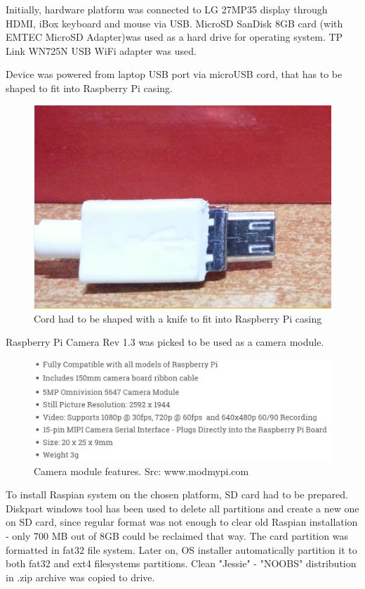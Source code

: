 \documentclass[12pt,twoside,a4paper]{article}
\begin{document}
Initially, hardware platform was connected to LG 27MP35 display through HDMI, iBox keyboard and mouse via USB. 
MicroSD SanDisk 8GB card (with EMTEC MicroSD Adapter)was used as a hard drive for operating system. 
TP Link WN725N USB WiFi adapter was used.

Device was powered from laptop USB port via microUSB cord, that has to be shaped to fit into Raspberry Pi casing.



\begin{figure}[H]
\centering
\includegraphics[width=0.3\paperwidth]{cable}
\caption{Cord had to be shaped with a knife to fit into Raspberry Pi casing}
\end{figure}

Raspberry Pi Camera Rev 1.3 was picked to be used as a camera module. 

\begin{figure}[H]
\centering
\includegraphics[width=0.5\paperwidth]{features}
\caption{Camera module features. Src: www.modmypi.com}
\end{figure}

To install Raspian system on the chosen platform, SD card had to be prepared.
Diskpart windows tool has been used to delete all partitions and create a new one on SD card, since regular format was not enough to clear old Raspian installation - only 700 MB out of 8GB could be reclaimed that way.
The card partition was formatted in fat32 file system.
Later on, OS installer automatically partition it to both fat32 and ext4 filesystems partitions.
Clean "Jessie" - "NOOBS" distribution in .zip archive was copied to drive.
\end{document}
